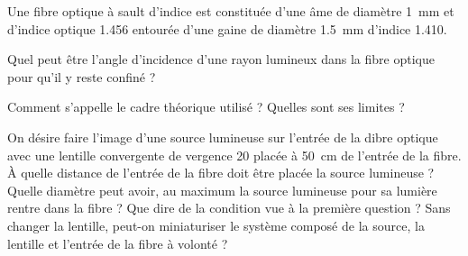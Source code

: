 

Une fibre optique à sault d'indice est constituée d'une âme de diamètre \SI{1}{mm} et d'indice optique \SI{1.456}{} entourée d'une gaine de diamètre \SI{1.5}{mm} d'indice \SI{1.410}{}.

\question Quel peut être l'angle d'incidence d'une rayon lumineux dans la fibre optique pour qu'il y reste confiné ?

\question Comment s'appelle le cadre théorique utilisé ? Quelles sont ses limites ?

\question On désire faire l'image d'une source lumineuse sur l'entrée de la dibre optique avec une lentille convergente de vergence \SI{20}{\delta} placée à \SI{50}{cm} de l'entrée de la fibre.
\subquestion À quelle distance de l'entrée de la fibre doit être placée la source lumineuse ?
\subquestion Quelle diamètre peut avoir, au maximum la source lumineuse pour sa lumière rentre dans la fibre ?
\subquestion Que dire de la condition vue à la première question ?
\subquestion Sans changer la lentille, peut-on miniaturiser le système composé de la source, la lentille et l'entrée de la fibre à volonté ?
